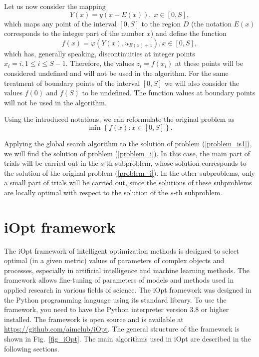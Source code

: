 \documentclass[iicol]{sn-jnl}
\theoremstyle{thmstyleone}%
\theoremstyle{thmstyletwo}%
\theoremstyle{thmstylethree}%
\begin{document}
Let us now consider the mapping
\[
Y(x)=y(x-E(x)), \; x\in[0,S],
\]
which maps any point of the interval $[0,S]$ to the region $D$ (the notation $E(x)$ corresponds to the integer part of the number $x$) and define the function
\begin{equation}\label{f}
f(x) = \varphi(Y(x),u_{E(x)+1}), x\in[0,S],
\end{equation}
which has, generally speaking, discontinuities at integer points $x_i = i, 1 \leq i \leq S-1$.
Therefore, the values $z_i = f(x_i)$ at these points will be considered undefined and will not be used in the algorithm.
\textcolor[rgb]{0,0,1}{For the same treatment of boundary points of the interval $[0,S]$ we will also consider the values $f(0)$ and $f(S)$ to be undefined. The function values at boundary points will not be used in the algorithm.}

Using the introduced notations, we can reformulate the original problem as
\begin{equation}\label{problem_is1}
\min \left\{f(x): x \in [0,S] \right\}.
\end{equation}

Applying the global search algorithm to the solution of problem (\ref{problem_is1}), we will find the solution of problem (\ref{problem_i}). In this case, the main part of trials will be carried out in the $s$-th subproblem, whose solution corresponds to the solution of the original problem (\ref{problem_i}). In the other subproblems, only a small part of trials will be carried out, since the solutions of these subproblems are locally optimal with respect to the solution of the $s$-th subproblem.

\section{iOpt framework}\label{sec_iOpt}

The iOpt framework of intelligent optimization methods is designed to select optimal (in a given metric) values of parameters of complex objects and processes, especially in artificial intelligence and machine learning methods. The framework allows fine-tuning of parameters of models and methods used in applied research in various fields of science.  The iOpt framework was designed in the Python programming language using its standard library. To use the framework, you need to have the Python interpreter version 3.8 or higher installed. The framework is open source and is available at \url{https://github.com/aimclub/iOpt}.
The general structure of the framework is shown in Fig.~\ref{fig_iOpt}. The main algorithms used in iOpt are described in the following sections.
\end{document}
